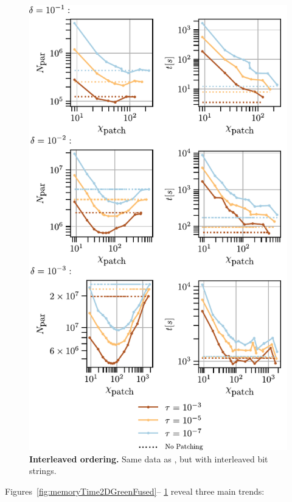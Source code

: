\begin{figure}[htbp]
    \centering
    \includegraphics{figures/2DGreenMemoryTimeInterleaved.pdf}
    \caption{\textbf{Interleaved ordering.}
    Same data as , but with
    interleaved bit strings.}
    \label{fig:memoryTime2DGreenInterleaved}
\end{figure}

Figures~\ref{fig:memoryTime2DGreenFused}–
\ref{fig:memoryTime2DGreenInterleaved} reveal three main trends:

